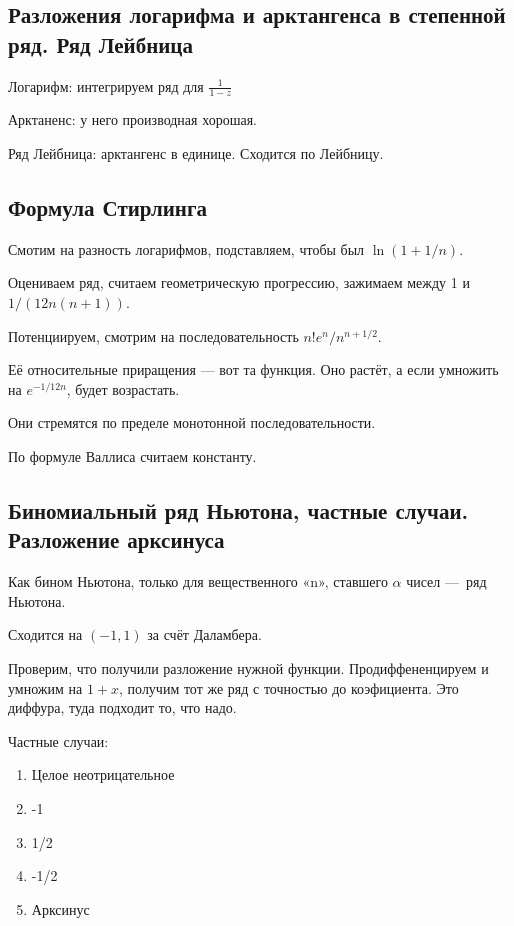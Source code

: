 \documentclass[12pt, a4paper, oneside]{memoir}
\begin{document}
\subsection{Разложения логарифма и арктангенса в степенной ряд. Ряд Лейбница}

Логарифм: интегрируем ряд для $\frac{1}{1 - z}$

Арктаненс: у него производная хорошая.

Ряд Лейбница: арктангенс в единице. Сходится по Лейбницу.



\subsection{Формула Стирлинга}

Смотим на разность логарифмов, подставляем, чтобы был $\ln (1 + 1/n)$.

Оцениваем ряд, считаем геометрическую прогрессию, зажимаем между 1 и $1/(12 n (n + 1))$.

Потенциируем, смотрим на последовательность $n! e^n / n^{n + 1/2}$.

Её относительные приращения — вот та функция. Оно растёт, а если умножить на $e^{-1/{12n}}$, будет возрастать.

Они стремятся по пределе монотонной последовательности.

По формуле Валлиса считаем константу.

\subsection{Биномиальный ряд Ньютона, частные случаи. Разложение арксинуса}

Как бином Ньютона, только для вещественного «n», ставшего $\alpha$ чисел — ряд Ньютона.

Сходится на $(-1, 1)$ за счёт Даламбера.

Проверим, что получили разложение нужной функции.
Продиффененцируем и умножим на $1 + x$, получим тот же ряд с точностью до коэфициента. Это диффура, туда подходит то, что надо.

Частные случаи:

\begin{enumerate}
    \item Целое неотрицательное
    \item -1
    \item 1/2
    \item -1/2
    \item Арксинус
\end{enumerate}
\end{document}
